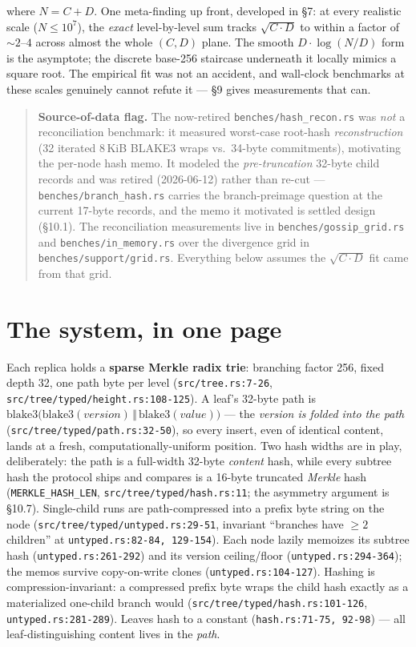 \documentclass[11pt]{article}
\newcommand{\code}[1]{\texttt{#1}}
\theoremstyle{plain}
\begin{document}
where $N = C + D$. One meta-finding up front, developed in \S7: at every
realistic scale ($N \le 10^7$), the \emph{exact} level-by-level sum tracks
$\sqrt{C \cdot D}$ to within a factor of ${\sim}2$--$4$ across almost the
whole $(C, D)$ plane. The smooth $D \cdot \log(N/D)$ form is the asymptote;
the discrete base-256 staircase underneath it locally mimics a square root.
The empirical fit was not an accident, and wall-clock benchmarks at these
scales genuinely cannot refute it --- \S9 gives measurements that can.

\begin{quote}
\textbf{Source-of-data flag.} The now-retired \code{benches/hash\_recon.rs}
was \emph{not} a reconciliation benchmark: it measured worst-case root-hash
\emph{reconstruction} (32 iterated 8\,KiB BLAKE3 wraps vs.\ 34-byte
commitments), motivating the per-node hash memo. It modeled the
\emph{pre-truncation} 32-byte child records and was retired (2026-06-12)
rather than re-cut --- \code{benches/branch\_hash.rs} carries the
branch-preimage question at the current 17-byte records, and the memo it
motivated is settled design (\S10.1). The
reconciliation measurements live in \code{benches/gossip\_grid.rs} and
\code{benches/in\_memory.rs} over the divergence grid in
\code{benches/support/grid.rs}. Everything below assumes the
$\sqrt{C \cdot D}$ fit came from that grid.
\end{quote}

\section{The system, in one page}

Each replica holds a \textbf{sparse Merkle radix trie}: branching factor
256, fixed depth 32, one path byte per level (\code{src/tree.rs:7-26},
\code{src/tree/typed/height.rs:108-125}). A leaf's 32-byte path is
$\mathrm{blake3}\bigl(\mathrm{blake3}(\textit{version}) \,\Vert\,
\mathrm{blake3}(\textit{value})\bigr)$ --- the \emph{version is folded into
the path} (\code{src/tree/typed/path.rs:32-50}), so every insert, even of
identical content, lands at a fresh, computationally-uniform position. Two
hash widths are in play, deliberately: the path is a full-width 32-byte
\emph{content} hash, while every subtree hash the protocol ships and
compares is a 16-byte truncated \emph{Merkle} hash
(\code{MERKLE\_HASH\_LEN}, \code{src/tree/typed/hash.rs:11}; the asymmetry
argument is \S10.7).
Single-child runs are path-compressed into a prefix byte string on the node
(\code{src/tree/typed/untyped.rs:29-51}, invariant ``branches have $\ge 2$
children'' at \code{untyped.rs:82-84, 129-154}). Each node lazily memoizes
its subtree hash (\code{untyped.rs:261-292}) and its version ceiling/floor
(\code{untyped.rs:294-364}); the memos survive copy-on-write clones
(\code{untyped.rs:104-127}). Hashing is compression-invariant: a compressed
prefix byte wraps the child hash exactly as a materialized one-child branch
would (\code{src/tree/typed/hash.rs:101-126}, \code{untyped.rs:281-289}).
Leaves hash to a constant (\code{hash.rs:71-75, 92-98}) --- all
leaf-distinguishing content lives in the \emph{path}.
\end{document}
